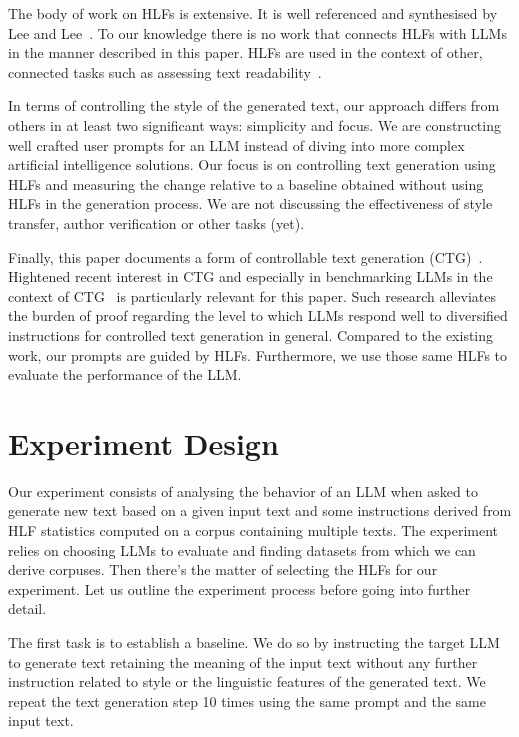 \documentclass[runningheads,a4paper,11pt]{article}
\begin{document}
The body of work on HLFs is extensive.
It is well referenced and synthesised by Lee and Lee~\cite{lftk-2023}.
To our knowledge there is no work that connects HLFs with LLMs in the manner
described in this paper.
HLFs are used in the context of other, connected tasks such as assessing text
readability~\cite{lee-etal-2021-pushing}.

In terms of controlling the style of the generated text, our approach differs
from others in at least two significant ways: simplicity and focus.
We are constructing well crafted user prompts for an LLM instead of diving into
more complex artificial intelligence solutions.
Our focus is on controlling text generation using HLFs and measuring the change
relative to a baseline obtained without using HLFs in the generation process.
We are not discussing the effectiveness of style transfer, author verification
or other tasks (yet).

Finally, this paper documents a form of controllable text generation
(CTG)~\cite{zhang-ctg-2022}.
Hightened recent interest in CTG and especially in benchmarking LLMs in the
context of CTG~\cite{chen2024benchmarking} is particularly relevant for this
paper.
Such research alleviates the burden of proof regarding the level to which
LLMs respond well to diversified instructions for controlled text generation in
general.
Compared to the existing work, our prompts are guided by HLFs.
Furthermore, we use those same HLFs to evaluate the performance of the LLM.


\section{Experiment Design}\label{method}

Our experiment consists of analysing the behavior of an LLM when asked to
generate new text based on a given input text and some instructions derived from
HLF statistics computed on a corpus containing multiple texts.
The experiment relies on choosing LLMs to evaluate and finding datasets from
which we can derive corpuses.
Then there's the matter of selecting the HLFs for our experiment.
Let us outline the experiment process before going into further detail.

The first task is to establish a baseline.
We do so by instructing the target LLM to generate text retaining the meaning of
the input text without any further instruction related to style or the
linguistic features of the generated text.
We repeat the text generation step 10 times using the same prompt and the same
input text.
\end{document}
